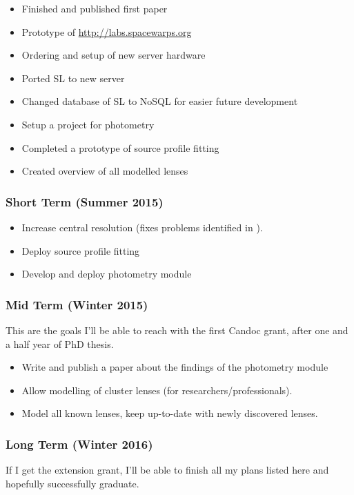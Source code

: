 \documentclass[11pt]{article}
\begin{document}
\begin{itemize}
  \item Finished and published first paper \cite{spaghetti}
  \item Prototype of \url{http://labs.spacewarps.org}
  \item Ordering and setup of new server hardware
  \item Ported SL to new server
  \item Changed database of SL to NoSQL for easier future development
  \item Setup a project for photometry
  \item Completed a prototype of source profile fitting
  \item Created overview of all modelled lenses
\end{itemize}



\subsubsection{Short Term (Summer 2015)} \label{sec:plan_short}

\begin{itemize}
  \item Increase central resolution (fixes problems identified in \cite{spaghetti}).
  \item Deploy source profile fitting
  \item Develop and deploy photometry module
\end{itemize}



\subsubsection{Mid Term (Winter 2015)} \label{sec:plan_mid}
This are the goals I'll be able to reach with the first Candoc grant, after one and a half year of PhD thesis.

\begin{itemize}
  \item Write and publish a paper about the findings of the photometry module
  \item Allow modelling of cluster lenses (for researchers/professionals).
  \item Model all known lenses, keep up-to-date with newly discovered lenses.
\end{itemize}



\subsubsection{Long Term (Winter 2016)} \label{sec:plan_long}
If I get the extension grant, I'll be able to finish all my plans listed here and hopefully successfully graduate.
\end{document}
